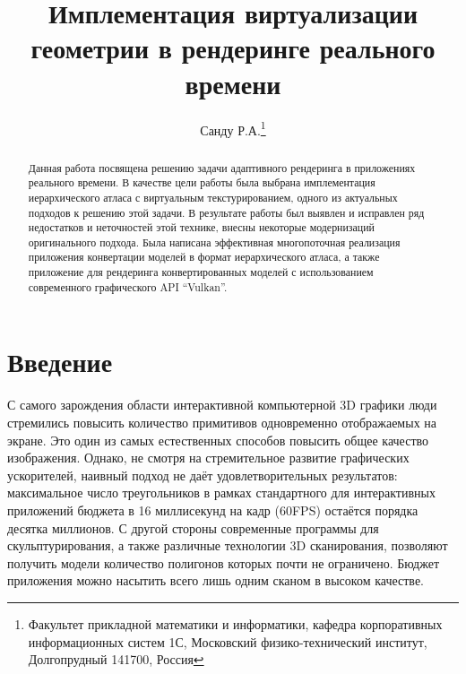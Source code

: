 \documentclass[12pt]{extarticle}
\begin{document}
\title{Имплементация виртуализации геометрии в рендеринге реального времени}

\author{Санду Р.А.\footnote{Факультет прикладной математики и информатики, кафедра корпоративных информационных систем 1С, Московский физико-технический институт, Долгопрудный 141700, Россия}}

\maketitle
\begin{abstract}
Данная работа посвящена решению задачи адаптивного рендеринга в приложениях реального времени. В качестве цели работы была выбрана имплементация иерархического атласа с виртуальным текстурированием, одного из актуальных подходов к решению этой задачи. В результате работы был выявлен и исправлен ряд недостатков и неточностей этой технике, внесны некоторые модернизаций оригинального подхода. Была написана эффективная многопоточная реализация приложения конвертации моделей в формат иерархического атласа, а также приложение для рендеринга конвертированных моделей с использованием современного графического API ``Vulkan''.
\end{abstract}
\thispagestyle{empty}

\newpage
\tableofcontents
\newpage

\section{Введение}
\label{sec:intro}
С самого зарождения области интерактивной компьютерной 3D графики люди стремились повысить количество примитивов одновременно отображаемых на экране. Это один из самых естественных способов повысить общее качество изображения. Однако, не смотря на стремительное развитие графических ускорителей, наивный подход не даёт удовлетворительных результатов: максимальное число треугольников в рамках стандартного для интерактивных приложений бюджета в 16 миллисекунд на кадр (60FPS) остаётся порядка десятка миллионов. С другой стороны современные программы для скульптурирования, а также различные технологии 3D сканирования, позволяют получить модели количество полигонов которых почти не ограничено. Бюджет приложения можно насытить всего лишь одним сканом в высоком качестве.
\end{document}
